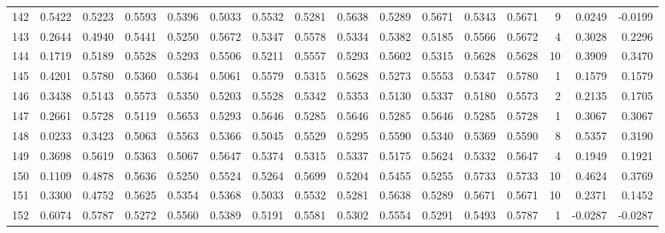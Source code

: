 \begin{tabular}{lrrrrrrrrrrrrrrr}
142 &      0.5422 &  0.5223 &  0.5593 &  0.5396 &  0.5033 &  0.5532 &  0.5281 &  0.5638 &  0.5289 &  0.5671 &   0.5343 &     0.5671 &      9 &                    0.0249 &                    -0.0199 \\
143 &      0.2644 &  0.4940 &  0.5441 &  0.5250 &  0.5672 &  0.5347 &  0.5578 &  0.5334 &  0.5382 &  0.5185 &   0.5566 &     0.5672 &      4 &                    0.3028 &                     0.2296 \\
144 &      0.1719 &  0.5189 &  0.5528 &  0.5293 &  0.5506 &  0.5211 &  0.5557 &  0.5293 &  0.5602 &  0.5315 &   0.5628 &     0.5628 &     10 &                    0.3909 &                     0.3470 \\
145 &      0.4201 &  0.5780 &  0.5360 &  0.5364 &  0.5061 &  0.5579 &  0.5315 &  0.5628 &  0.5273 &  0.5553 &   0.5347 &     0.5780 &      1 &                    0.1579 &                     0.1579 \\
146 &      0.3438 &  0.5143 &  0.5573 &  0.5350 &  0.5203 &  0.5528 &  0.5342 &  0.5353 &  0.5130 &  0.5337 &   0.5180 &     0.5573 &      2 &                    0.2135 &                     0.1705 \\
147 &      0.2661 &  0.5728 &  0.5119 &  0.5653 &  0.5293 &  0.5646 &  0.5285 &  0.5646 &  0.5285 &  0.5646 &   0.5285 &     0.5728 &      1 &                    0.3067 &                     0.3067 \\
148 &      0.0233 &  0.3423 &  0.5063 &  0.5563 &  0.5366 &  0.5045 &  0.5529 &  0.5295 &  0.5590 &  0.5340 &   0.5369 &     0.5590 &      8 &                    0.5357 &                     0.3190 \\
149 &      0.3698 &  0.5619 &  0.5363 &  0.5067 &  0.5647 &  0.5374 &  0.5315 &  0.5337 &  0.5175 &  0.5624 &   0.5332 &     0.5647 &      4 &                    0.1949 &                     0.1921 \\
150 &      0.1109 &  0.4878 &  0.5636 &  0.5250 &  0.5524 &  0.5264 &  0.5699 &  0.5204 &  0.5455 &  0.5255 &   0.5733 &     0.5733 &     10 &                    0.4624 &                     0.3769 \\
151 &      0.3300 &  0.4752 &  0.5625 &  0.5354 &  0.5368 &  0.5033 &  0.5532 &  0.5281 &  0.5638 &  0.5289 &   0.5671 &     0.5671 &     10 &                    0.2371 &                     0.1452 \\
152 &      0.6074 &  0.5787 &  0.5272 &  0.5560 &  0.5389 &  0.5191 &  0.5581 &  0.5302 &  0.5554 &  0.5291 &   0.5493 &     0.5787 &      1 &                   -0.0287 &                    -0.0287 \\

\end{tabular}
